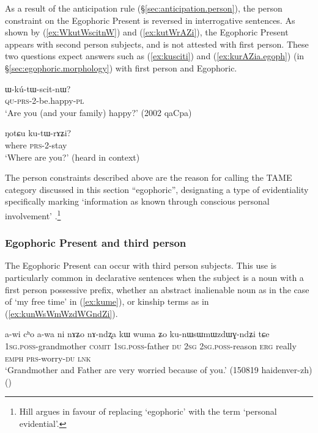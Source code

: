 As a result of the anticipation rule 
(§\ref{sec:anticipation.person}), the person constraint on the Egophoric Present is reversed in interrogative sentences. As shown by (\ref{ex:WkutWscitnW}) and (\ref{ex:kutWrAZi}), the Egophoric Present appears with second person subjects, and is not attested with first person. These two questions expect answers such as (\ref{ex:kusciti}) and (\ref{ex:kurAZia.egoph}) (in §\ref{sec:egophoric.morphology}) with first person and Egophoric.

\begin{exe}
	\ex \label{ex:WkutWscitnW}
	\gll ɯ-kú-tɯ-scit-nɯ? \\
	\textsc{qu}-\textsc{prs}-2-be.happy-\textsc{pl} \\
	\glt `Are you (and your family) happy?' (2002 qaCpa)
\end{exe}

\begin{exe}
	\ex \label{ex:kutWrAZi}
	\gll ŋotɕu ku-tɯ-rɤʑi? \\
	where \textsc{prs}-2-stay \\
	\glt `Where are you?' (heard in context)
\end{exe}

The person constraints described above are the reason for calling the TAME category discussed in this section ``egophoric'', designating a type of evidentiality specifically marking `information as known through conscious personal involvement' \citep{hill20egophoricity}.\footnote{Hill argues in favour of replacing `egophoric' with the term `personal evidential'. } 
 
\subsubsection{Egophoric Present and third person} 
The Egophoric Present can occur with third person subjects. This use is particularly common in declarative sentences when the subject is a noun with a first person possessive prefix, whether an abstract inalienable noun as in the case of  `my free time' in (\ref{ex:kume}), or kinship terms as in (\ref{ex:kunWsWmWzdWGndZi}).

\begin{exe}
\ex \label{ex:kunWsWmWzdWGndZi}
\gll a-wi cʰo a-wa ni nɤʑo nɤ-ndʐa kɯ wuma ʑo ku-nɯsɯmɯzdɯɣ-ndʑi tɕe \\
\textsc{1sg}.\textsc{poss}-grandmother \textsc{comit} \textsc{1sg}.\textsc{poss}-father \textsc{du} \textsc{2sg} \textsc{2sg}.\textsc{poss}-reason \textsc{erg} really \textsc{emph} \textsc{prs}-worry-\textsc{du} \textsc{lnk} \\
\glt `Grandmother and Father are very worried because of you.' (150819 haidenver-zh)
()
\end{exe}

